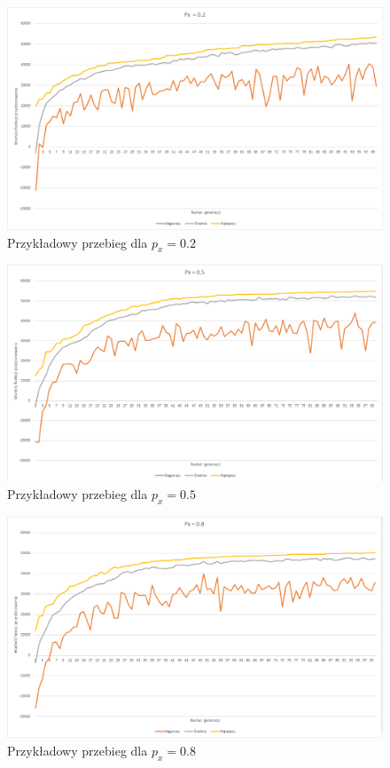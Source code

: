 \documentclass{article}
\begin{document}
	\begin{figure}[H]
		\centering
		\includegraphics[width=1\linewidth]{cross02.png}
		\caption{Przykładowy przebieg dla $p_x=0.2$}
		\label{fig:px02}
	\end{figure}
	
	\begin{figure}[H]
		\centering
		\includegraphics[width=1\linewidth]{cross05.png}
		\caption{Przykładowy przebieg dla $p_x=0.5$}
		\label{fig:px05}
	\end{figure}
	
	\begin{figure}[H]
		\centering
		\includegraphics[width=1\linewidth]{cross08.png}
		\caption{Przykładowy przebieg dla $p_x=0.8$}
		\label{fig:px08}
	\end{figure}
	
\end{document}
